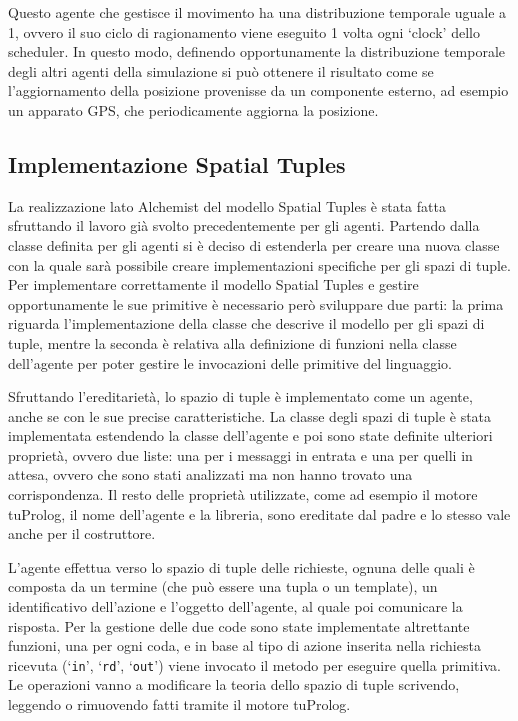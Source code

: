 Questo agente che gestisce il movimento ha una distribuzione temporale uguale a 1, ovvero il suo ciclo di ragionamento viene eseguito 1 volta ogni `clock' dello scheduler. In questo modo, definendo opportunamente la distribuzione temporale degli altri agenti della simulazione si può ottenere il risultato come se l'aggiornamento della posizione provenisse da un componente esterno, ad esempio un apparato GPS, che periodicamente aggiorna la posizione.

\subsection{Implementazione Spatial Tuples}\label{sctn:ImplementazioneSpatialTuples}
La realizzazione lato Alchemist del modello Spatial Tuples è stata fatta sfruttando il lavoro già svolto precedentemente per gli agenti. Partendo dalla classe definita per gli agenti si è deciso di estenderla per creare una nuova classe con la quale sarà possibile creare implementazioni specifiche per gli spazi di tuple. Per implementare correttamente il modello Spatial Tuples e gestire opportunamente le sue primitive è necessario però sviluppare due parti: la prima riguarda l'implementazione della classe che descrive il modello per gli spazi di tuple, mentre la seconda è relativa alla definizione di funzioni nella classe dell'agente per poter gestire le invocazioni delle primitive del linguaggio.

Sfruttando l'ereditarietà, lo spazio di tuple è implementato come un agente, anche se con le sue precise caratteristiche. La classe degli spazi di tuple è stata implementata estendendo la classe dell'agente e poi sono state definite ulteriori proprietà, ovvero due liste: una per i messaggi in entrata e una per quelli in attesa, ovvero che sono stati analizzati ma non hanno trovato una corrispondenza.
Il resto delle proprietà utilizzate, come ad esempio il motore tuProlog, il nome dell'agente e la libreria, sono ereditate dal padre e lo stesso vale anche per il costruttore.

L'agente effettua verso lo spazio di tuple delle richieste, ognuna delle quali è composta da un termine (che può essere una tupla o un template), un identificativo dell'azione e l'oggetto dell'agente, al quale poi comunicare la risposta.
Per la gestione delle due code sono state implementate altrettante funzioni, una per ogni coda, e in base al tipo di azione inserita nella richiesta ricevuta (`\texttt{in}', `\texttt{rd}', `\texttt{out}') viene invocato il metodo per eseguire quella primitiva. Le operazioni vanno a modificare la teoria dello spazio di tuple scrivendo, leggendo o rimuovendo fatti tramite il motore tuProlog.

